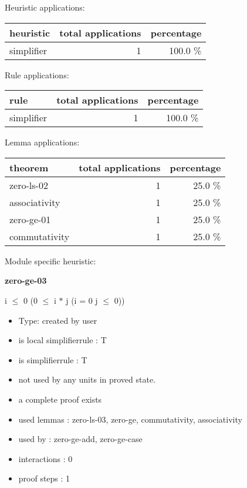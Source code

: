 \documentclass[a4paper]{article}
\begin{document}
\medskip


Heuristic applications:

\begin{supertabular}{l|r|r}
heuristic	& total applications & percentage \\ \hline
simplifier & 1 & 100.0 \% \\

\end{supertabular}

Rule applications:

\begin{supertabular}{l|r|r}
rule	        & total applications & percentage \\ \hline
simplifier & 1 & 100.0 \% \\

\end{supertabular}

Lemma applications:

\begin{supertabular}{l|r|r}
theorem	        & total applications & percentage \\ \hline
zero-ls-02 & 1 & 25.0 \% \\
associativity & 1 & 25.0 \% \\
zero-ge-01 & 1 & 25.0 \% \\
commutativity & 1 & 25.0 \% \\

\end{supertabular}

Module specific heuristic:

\pagebreak

{\LARGE\bf zero-ge-03}\label{lemma-zero-ge-03}

\medskip

 \Fol i $\le$ 0 \Imp (0 $\le$ i $*$ j \Equiv \Not \Not (i = 0 \Or j $\le$ 0))

\begin{itemize}

\item Type: created by user

\item is local simplifierrule : T
\item is simplifierrule : T
\item not used by any units in proved state.
\item       a complete proof exists
\item       used lemmas  : zero-ls-03, zero-ge, commutativity, associativity
\item       used by      : zero-ge-add, zero-ge-case
\item       interactions : 0
\item       proof steps  : 1
\end{itemize}
\end{document}
